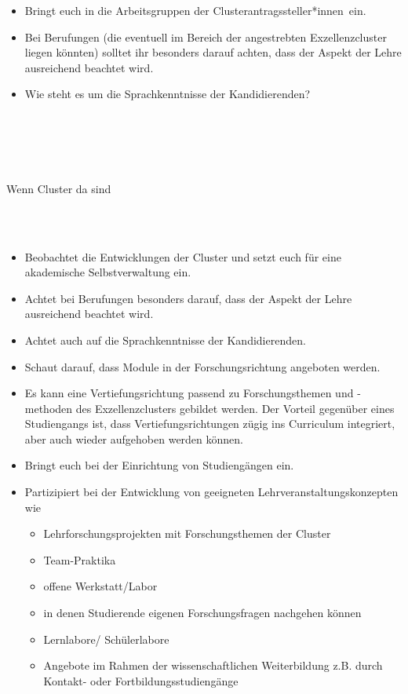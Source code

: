 \documentclass[DIV=calc]{scrartcl}
\newcommand{\gen}{*innen}
\begin{document}
\begin{minipage}{0.95\textwidth}
\begin{minipage}{0.95\textwidth}
\begin{itemize}
    \item Bringt euch in die Arbeitsgruppen der Clusterantragssteller\gen\ ein.
    \item Bei Berufungen (die eventuell im Bereich der angestrebten
Exzellenzcluster liegen könnten) solltet ihr besonders darauf achten,
dass der Aspekt der Lehre ausreichend beachtet wird.
    \item Wie steht es um die Sprachkenntnisse der Kandidierenden?
    \end{itemize}
    \end{minipage}\\\\
\end{minipage}
\begin{minipage}{0.05\textwidth}
~
\end{minipage}
\begin{minipage}{0.95\textwidth}
    Wenn Cluster da sind\\\\
    \begin{minipage}{0.05\textwidth}
        ~ %
    \end{minipage}
    \begin{minipage}{0.95\textwidth}
    \begin{itemize}
    \item Beobachtet die Entwicklungen der Cluster und setzt euch für eine akademische
Selbstverwaltung ein.
    \item Achtet bei Berufungen besonders darauf, dass der Aspekt der Lehre ausreichend beachtet wird.
    \item Achtet auch auf die Sprachkenntnisse der Kandidierenden.
    \item Schaut darauf, dass Module in der Forschungsrichtung angeboten werden.
    \item Es kann eine Vertiefungsrichtung passend zu Forschungsthemen und -methoden des Exzellenzclusters gebildet werden. Der Vorteil gegenüber eines Studiengangs ist, dass Vertiefungsrichtungen zügig ins Curriculum integriert, aber auch wieder aufgehoben werden können.
    \item Bringt euch bei der Einrichtung von Studiengängen ein.
    \item Partizipiert bei der Entwicklung von geeigneten Lehrveranstaltungskonzepten wie
    \begin{itemize}
    \item Lehrforschungsprojekten mit Forschungsthemen der Cluster
    \item Team-Praktika
    \item offene Werkstatt/Labor
    \item in denen Studierende eigenen Forschungsfragen nachgehen können
    \item Lernlabore/ Schülerlabore
    \item Angebote im Rahmen der wissenschaftlichen Weiterbildung z.B. durch Kontakt- oder Fortbildungsstudiengänge
    \end{itemize}
    \end{itemize}
    \end{minipage}
\end{minipage}
\end{document}
